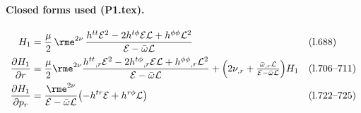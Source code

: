 \paragraph{Closed forms used (P1.tex).}
\begin{align}
H_1 &= \frac{\mu}{2}\,\rme^{2\nu}\,
       \frac{h^{tt}\mathcal{E}^2 - 2h^{t\phi}\mathcal{E}\mathcal{L} + h^{\phi\phi}\mathcal{L}^2}
            {\mathcal{E}-\bar\omega\mathcal{L}}
       && \text{(l.688)}\\
\frac{\partial H_1}{\partial r}
   &= \frac{\mu}{2}\rme^{2\nu}
      \frac{h^{tt}{}_{,r}\mathcal{E}^2 - 2h^{t\phi}{}_{,r}\mathcal{E}\mathcal{L}
            + h^{\phi\phi}{}_{,r}\mathcal{L}^2}{\mathcal{E}-\bar\omega\mathcal{L}}
   + \Bigl(2\nu_{,r}+\tfrac{\bar\omega_{,r}\mathcal{L}}{\mathcal{E}-\bar\omega\mathcal{L}}\Bigr)H_1
      && \text{(l.706--711)}\\
\frac{\partial H_1}{\partial p_r}
   &= \frac{\rme^{2\nu}}{\mathcal{E}-\bar\omega\mathcal{L}}
      \bigl(-h^{tr}\mathcal{E} + h^{r\phi}\mathcal{L}\bigr)
      && \text{(l.722--725)}
\end{align}

%
%

